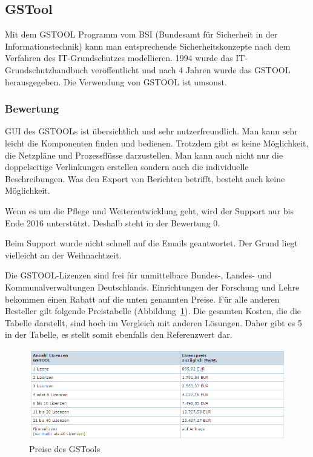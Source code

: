 \subsection{GSTool}

Mit dem GSTOOL Programm vom BSI (Bundesamt für Sicherheit in der Informationstechnik) kann man entsprechende Sicherheitskonzepte
nach dem Verfahren des IT-Grundschutzes modellieren.
1994 wurde das IT-Grundschutzhandbuch veröffentlicht und nach 4 Jahren wurde das GSTOOL herausgegeben.
Die Verwendung von GSTOOL ist umsonst.

\subsubsection{Bewertung}

GUI des GSTOOLs ist übersichtlich und sehr nutzerfreundlich. Man kann sehr leicht die Komponenten finden und bedienen. Trotzdem gibt es keine Möglichkeit, die Netzpläne und Prozessflüsse darzustellen. Man kann auch nicht nur die doppelseitige Verlinkungen erstellen sondern auch die individuelle Beschreibungen. Was den Export von Berichten betrifft, besteht auch keine Möglichkeit.     

Wenn es um die Pflege und Weiterentwicklung geht, wird der Support nur bis Ende 2016 unterstützt. Deshalb steht in der Bewertung 0. 

Beim Support wurde nicht schnell auf die Emails geantwortet. Der Grund liegt vielleicht an der Weihnachtzeit.  



Die GSTOOL-Lizenzen sind frei für unmittelbare Bundes-, Landes- und Kommunalverwaltungen Deutschlands.
Einrichtungen der Forschung und Lehre bekommen einen Rabatt auf die unten genannten Preise.
Für alle anderen Besteller gilt folgende Preistabelle (Abbildung~\ref{fig:GSToolschema}).
Die gesamten Kosten, die die Tabelle darstellt, sind hoch im Vergleich mit anderen Lösungen. Daher gibt es 5 in der Tabelle, es stellt somit ebenfalls den Referenzwert dar.  


\begin{figure}[htbp]
	\includegraphics[scale=0.6]{images/gstoolpreis}
	\caption{Preise des GSTools}
	\label{fig:GSToolschema}
\end{figure}

